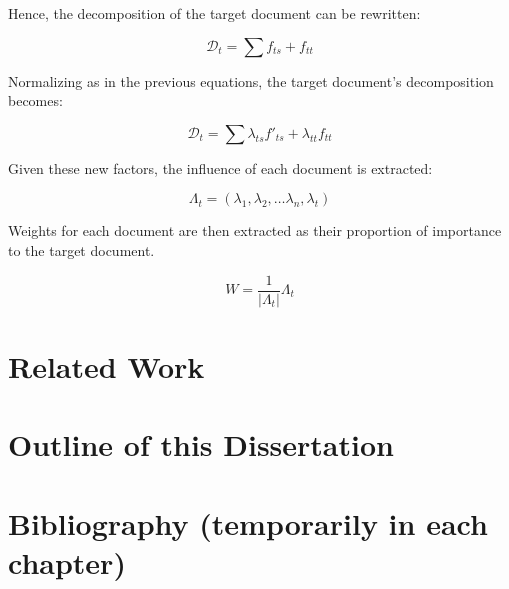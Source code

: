 \documentclass[../dissertation.tex]{subfiles}
\begin{document}
Hence, the decomposition of the target document can be rewritten:

\begin{equation} \label{eq:influence_factors}
  \mathcal{D}_t = \sum f_{ts} + f_{tt}
\end{equation}

Normalizing as in the previous equations, the target
document's decomposition becomes:

\begin{equation} \label{eq:influence_factors_normalized}
  \mathcal{D}_t = \sum \lambda_{ts} f'_{ts} + \lambda_{tt} f_{tt}
\end{equation}

Given these new factors, the influence of each document is extracted:

\begin{equation} \label{eq:document_lambda}
  \Lambda_t = (\lambda_1, \lambda_2, \ldots \lambda_n, \lambda_t)
\end{equation}

Weights for each document are then extracted as their proportion of
importance to the target document.

\begin{equation} \label{eq:document_weights}
  W = \displaystyle\frac{1}{|\Lambda_t|} \Lambda_t
\end{equation}

\section{Related Work}

\section{Outline of this Dissertation}

\section{Bibliography (temporarily in each chapter)}


\end{document}
